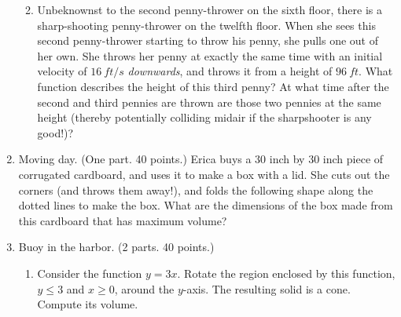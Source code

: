 \documentclass[10pt]{amsart}
\begin{document}
\begin{enumerate}
\begin{enumerate}
\vfill\pagebreak

\begin{figure}[h]
\begin{center}
\end{center}
\end{figure}



\vfill\pagebreak


\item Unbeknownst to the second penny-thrower on the sixth floor, there is
a
sharp-shooting penny-thrower on the twelfth floor.  When she sees this
second penny-thrower
starting to throw his penny, she pulls one out of her own.  She throws 
her penny at exactly the same time with an initial velocity of $16\ ft/s$
{\em downwards}, and throws it from a height of $96\ ft$. What function
describes the height of this third penny? At what time after the second 
and third pennies are thrown are those two pennies at
the same height (thereby potentially colliding midair if the sharpshooter
is any good!)?
\end{enumerate}

\vfill\pagebreak

\item {\sc Moving day.} (One part. 40 points.) Erica buys a $30$
inch by $30$ inch piece of corrugated cardboard, and uses it to make a
box with a lid.  She cuts out the corners (and throws them away!), and
folds the following shape along the dotted lines to make the box.
What are the dimensions of the box made from this cardboard that has
maximum volume?

\begin{figure}[h]
\end{figure}

\vfill\pagebreak

\item {\sc Buoy in the harbor.} (2 parts.  40 points.)

\begin{enumerate}
\item Consider the function $y=3x$.  Rotate the region enclosed by
this function, $y\leq 3$ and $x\geq 0$, around the $y$-axis.  The
resulting solid is a cone.  Compute its volume.



\end{enumerate}
\end{enumerate}
\end{document}
